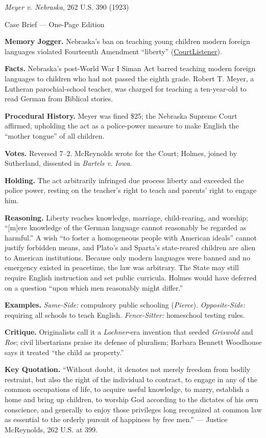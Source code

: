 \documentclass[12pt]{article}
\begin{document}
\begin{center}
{\Large \textit{Meyer v. Nebraska}, 262 U.S. 390 (1923)\par}
\vspace{0.3em}
{\normalsize Case Brief --- One-Page Edition\par}
\end{center}

\textbf{Memory Jogger.} Nebraska's ban on teaching young children modern foreign languages violated Fourteenth Amendment ``liberty'' (\href{https://www.courtlistener.com/opinion/100233/meyer-v-nebraska/}{CourtListener}).

\textbf{Facts.} Nebraska's post-World War I Siman Act barred teaching modern foreign languages to children who had not passed the eighth grade. Robert T. Meyer, a Lutheran parochial-school teacher, was charged for teaching a ten-year-old to read German from Biblical stories.

\textbf{Procedural History.} Meyer was fined \$25; the Nebraska Supreme Court affirmed, upholding the act as a police-power measure to make English the ``mother tongue'' of all children.

\textbf{Votes.} Reversed 7--2. McReynolds wrote for the Court; Holmes, joined by Sutherland, dissented in \textit{Bartels v. Iowa}.

\textbf{Holding.} The act arbitrarily infringed due process liberty and exceeded the police power, resting on the teacher's right to teach and parents' right to engage him.

\textbf{Reasoning.} Liberty reaches knowledge, marriage, child-rearing, and worship; ``[m]ere knowledge of the German language cannot reasonably be regarded as harmful.'' A wish ``to foster a homogeneous people with American ideals'' cannot justify forbidden means, and Plato's and Sparta's state-reared children are alien to American institutions. Because only modern languages were banned and no emergency existed in peacetime, the law was arbitrary. The State may still require English instruction and set public curricula. Holmes would have deferred on a question ``upon which men reasonably might differ.''

\textbf{Examples.} \emph{Same-Side:} compulsory public schooling (\textit{Pierce}). \emph{Opposite-Side:} requiring all schools to teach English. \emph{Fence-Sitter:} homeschool testing rules.

\textbf{Critique.} Originalists call it a \textit{Lochner}-era invention that seeded \textit{Griswold} and \textit{Roe}; civil libertarians praise its defense of pluralism; Barbara Bennett Woodhouse says it treated ``the child as property.''

\textbf{Key Quotation.} ``Without doubt, it denotes not merely freedom from bodily restraint, but also the right of the individual to contract, to engage in any of the common occupations of life, to acquire useful knowledge, to marry, establish a home and bring up children, to worship God according to the dictates of his own conscience, and generally to enjoy those privileges long recognized at common law as essential to the orderly pursuit of happiness by free men.'' --- Justice McReynolds, 262 U.S. at 399.
\end{document}
